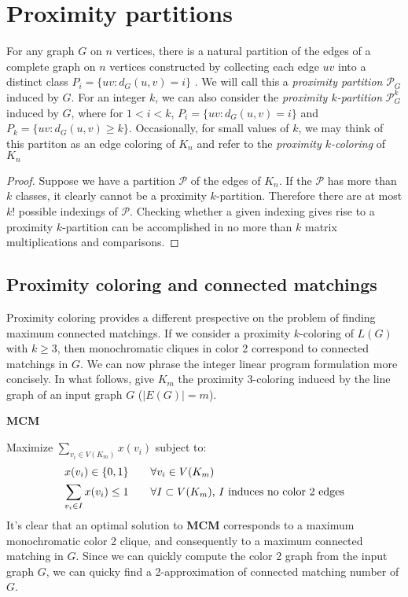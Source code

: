 %
%


\section{Proximity partitions}

For any graph $G$ on $n$ vertices, there is a natural partition of the edges of a complete graph on $n$ vertices constructed by collecting each edge $uv$ into a distinct class $P_i = \{uv : d_G(u,v) = i\}$ .  We will call this a \textit{proximity partition} $\mathcal{P}_G$ induced by $G$.  For an integer $k$, we can also consider the \textit{proximity $k$-partition} $\mathcal{P}^k_G$ induced by $G$, where for $1 < i < k$, $P_i = \{uv : d_G(u,v) = i\}$ and $P_k = \{uv : d_G(u,v) \geq k\}$. Occasionally, for small values of $k$, we may think of this partiton as an edge coloring of $K_n$ and refer to the \textit{proximity $k$-coloring} of $K_n$ 


\begin{proof}
Suppose we have a partition $\mathcal{P}$ of the edges of $K_n$. If the $\mathcal{P}$ has more than $k$ classes, it clearly cannot be a proximity $k$-partition. Therefore there are at most $k!$ possible indexings of $\mathcal{P}$.  Checking whether a given indexing gives rise to a proximity $k$-partition can be accomplished in no more than $k$ matrix multiplications and comparisons.  
\end{proof}

\subsection{Proximity coloring and connected matchings}

Proximity coloring provides a different prespective on the problem of finding maximum connected matchings.  If we consider a proximity $k$-coloring of $L(G)$ with $k \geq 3$, then monochromatic cliques in color 2 correspond to connected matchings in $G$.  We can now phrase the integer linear program formulation more concisely.  In what follows, give $K_m$ the proximity $3$-coloring induced by the line graph of an input graph $G$ ($|E(G)| = m$). 

\noindent\textbf{MCM}

\noindent Maximize $\displaystyle \sum_{v_i \in V(K_m)} x(v_i)$ subject to: 
\begin{align}
	x(v_i) \in \{0,1\} \qquad &\forall v_i \in V(K_m)\\
	\sum_{v_i \in I} x(v_i) \leq 1 \qquad &\forall I\subset V(K_m)\makebox{, $I$ induces no color 2 edges}
\end{align} 
It's clear that an optimal solution to \textbf{MCM} corresponds to a maximum monochromatic color 2 clique, and consequently to a maximum connected matching in $G$. Since we can quickly compute the color 2 graph from the input graph $G$, we can quicky find a 2-approximation of connected matching number of $G$.

